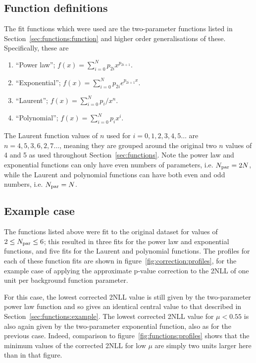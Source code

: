 \subsection{Function definitions}
\label{sec:correction:functions}
The fit functions which were used are the two-parameter functions listed in 
Section~\ref{sec:functions:function} and higher order generalisations of
these. Specifically, these are
\begin{enumerate}
\item
``Power law''; $f(x) = \sum_{i=0}^N p_{2i} x^{p_{2i+1}}$.
\item
``Exponential''; $f(x) = \sum_{i=0}^N p_{2i} e^{p_{2i+1}x}$.
\item
``Laurent''; $f(x) = \sum_{i=0}^N p_i/x^n$.
\item
``Polynomial''; $f(x) = \sum_{i=0}^N p_i x^i$.
\end{enumerate}
The Laurent function values of $n$ used for $i=0,1,2,3,4,5\dots$ are
$n=4,5,3,6,2,7\dots$, meaning they are grouped around the original
two $n$ values of 4 and 5 as used throughout Section~\ref{sec:functions}.
Note the power law and exponential functions can only have even numbers of
parameters, i.e. $N_{\rm par}=2N$, while the Laurent and polynomial functions
can have both even and odd numbers, i.e. $N_{\rm par}=N$.


\subsection{Example case}
\label{sec:correction:example}

The functions listed above were fit to the original dataset for values of 
$2 \le N_{\rm par} \le 6$; this resulted in three fits for the power law and
exponential functions, and five fits for the Laurent and polynomial functions.
The profiles for each of these function fits are shown in
figure~\ref{fig:correction:profiles}, for the example case of 
applying the approximate p-value correction to the 2NLL of one unit per 
background function parameter.

For this case, the lowest corrected 2NLL value is still given by the
two-parameter power law function and so gives an identical central value
to that described in Section~\ref{sec:functions:example}. The lowest corrected
2NLL value for $\mu < 0.55$ is also again given by the two-parameter exponential
function, also as for the previous case. 
Indeed, comparison to figure~\ref{fig:functions:profiles} shows that the
minimum values of the corrected 2NLL for low $\mu$
are simply two units larger here than in that figure.

